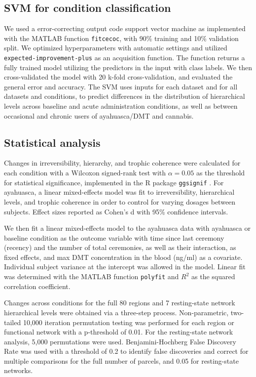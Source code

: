 \subsection{SVM for condition classification} 
We used a error-correcting output code support vector machine
as implemented with the MATLAB function \texttt{fitcecoc}, with 90\%
training and 10\% validation split. We optimized hyperparameters with
automatic settings and utilized \texttt{expected-improvement-plus} as an
acquisition function. The function returns a fully trained model
utilizing the predictors in the input with class labels. We then
cross-validated the model with 20 k-fold cross-validation, and evaluated
the general error and accuracy. The SVM uses inputs for each dataset and
for all datasets and conditions, to predict differences in the
distribution of hierarchical levels across baseline and acute
administration conditions, as well as between occasional and chronic
users of ayahuasca/DMT and cannabis. 
\subsection{Statistical analysis}
Changes
in irreversibility, hierarchy, and trophic coherence were calculated for
each condition with a Wilcoxon signed-rank test with \(\alpha = 0.05\) as
the threshold for statistical significance, implemented in the R package
\texttt{ggsignif} \parencite{ggsignif, Tidyverse, Package}. For ayahuasca,
a linear mixed-effects model was fit to irreversibility, hierarchical levels, and
trophic coherence in order to control for varying dosages between subjects. Effect sizes reported as Cohen's d with 95\% confidence intervals. 

We then fit a linear mixed-effects model to the ayahuasca data with
ayahuasca or baseline condition as the outcome variable with time since
last ceremony (recency) and the number of total ceremonies, as well as
their interaction, as fixed effects, and max DMT concentration in the
blood (ng/ml) as a covariate. Individual subject variance at the
intercept was allowed in the model. Linear fit was determined with the
MATLAB function \texttt{polyfit} and \(R^2\) as the squared correlation
coefficient.

Changes across conditions for the full 80 regions and 7 resting-state network
hierarchical levels were obtained via a three-step process.
Non-parametric, two-tailed 10,000 iteration permutation testing was
performed for each region or functional network with a p-threshold of
0.01. For the resting-state network analysis, 5,000 permutations were used. Benjamini-Hochberg False Discovery Rate was used with a threshold
of 0.2 to identify false discoveries and correct for multiple
comparisons \parencite{Benjamini1995} for the full number of parcels, and 0.05 for resting-state networks. 